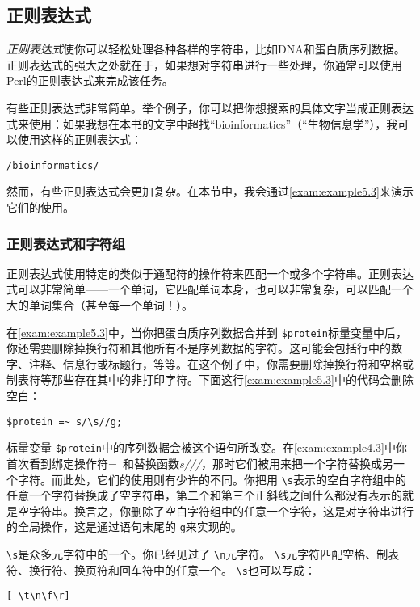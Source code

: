 \subsection{正则表达式}
\textit{正则表达式}使你可以轻松处理各种各样的字符串，比如DNA和蛋白质序列数据。正则表达式的强大之处就在于，如果想对字符串进行一些处理，你通常可以使用Perl的正则表达式来完成该任务。

有些正则表达式非常简单。举个例子，你可以把你想搜索的具体文字当成正则表达式来使用：如果我想在本书的文字中超找“bioinformatics”（“生物信息学”），我可以使用这样的正则表达式：

\begin{lstlisting}
/bioinformatics/
\end{lstlisting}

然而，有些正则表达式会更加复杂。在本节中，我会通过\autoref{exam:example5.3}来演示它们的使用。

\subsubsection{正则表达式和字符组}
正则表达式使用特定的类似于通配符的操作符来匹配一个或多个字符串。正则表达式可以非常简单——一个单词，它匹配单词本身，也可以非常复杂，可以匹配一个大的单词集合（甚至每一个单词！）。

在\autoref{exam:example5.3}中，当你把蛋白质序列数据合并到 \verb|$protein|标量变量中后，你还需要删除掉换行符和其他所有不是序列数据的字符。这可能会包括行中的数字、注释、信息行或标题行，等等。在这个例子中，你需要删除掉换行符和空格或制表符等那些存在其中的非打印字符。下面这行\autoref{exam:example5.3}中的代码会删除空白：

\begin{lstlisting}
$protein =~ s/\s//g;
\end{lstlisting}

标量变量 \verb|$protein|中的序列数据会被这个语句所改变。在\autoref{exam:example4.3}中你首次看到绑定操作符=~和替换函数\textit{s///}，那时它们被用来把一个字符替换成另一个字符。而此处，它们的使用则有少许的不同。你把用 \verb|\s|表示的空白字符组中的任意一个字符替换成了空字符串，第二个和第三个正斜线之间什么都没有表示的就是空字符串。换言之，你删除了空白字符组中的任意一个字符，这是对字符串进行的全局操作，这是通过语句末尾的 \verb|g|来实现的。

 \verb|\s|是众多元字符中的一个。你已经见过了 \verb|\n|元字符。 \verb|\s|元字符匹配空格、制表符、换行符、换页符和回车符中的任意一个。 \verb|\s|也可以写成：

\begin{lstlisting}
[ \t\n\f\r]
\end{lstlisting}

